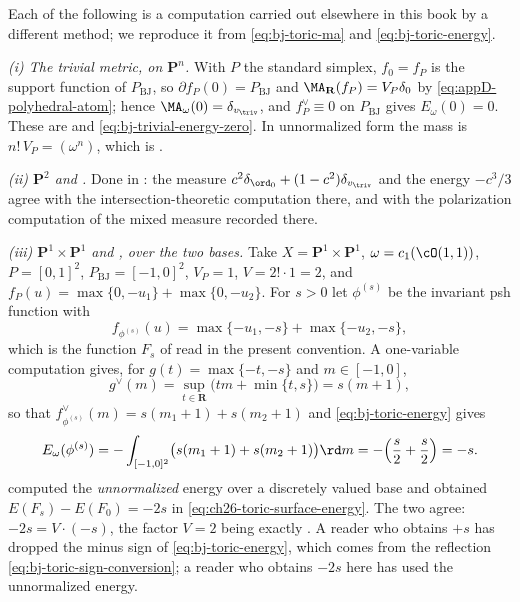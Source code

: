 \begin{example}
\label{ex:ch49-unit-tests}
Each of the following is a computation carried out elsewhere in this book
by a different method; we reproduce it from
\eqref{eq:bj-toric-ma} and \eqref{eq:bj-toric-energy}.

\emph{(i) The trivial metric, on $\mathbf P^n$.}  With $P$ the
standard simplex, $f_0=f_P$ is the support function of
$P_{\mathrm{BJ}}$, so $\partial f_P(0)=P_{\mathrm{BJ}}$ and
$\MA_{\mathbf R}(f_P)=V_P\delta_0$ by
\eqref{eq:appD-polyhedral-atom}; hence
$\MA_\omega(0)=\delta_{v_{\triv}}$, and
$f^\vee_P\equiv0$ on $P_{\mathrm{BJ}}$ gives $E_\omega(0)=0$.  These
are  and
\eqref{eq:bj-trivial-energy-zero}.  In unnormalized form the mass is
$n!\,V_P=(\omega^n)$, which is .

\emph{(ii) $\mathbf P^2$ and .}  Done in
: the measure
$c^2\delta_{\ord_0}+(1-c^2)\delta_{v_{\triv}}$ and the energy
$-c^3/3$ agree with the intersection-theoretic computation there, and
with the polarization computation of the mixed measure recorded there.

\emph{(iii) $\mathbf P^1\times\mathbf P^1$ and
, over the two bases.}  Take
$X=\mathbf P^1\times\mathbf P^1$, $\omega=c_1(\cO(1,1))$,
$P=[0,1]^2$, $P_{\mathrm{BJ}}=[-1,0]^2$, $V_P=1$,
$V=2!\cdot1=2$, and
$f_P(u)=\max\{0,-u_1\}+\max\{0,-u_2\}$.  For $s>0$ let
$\phi^{(s)}$ be the invariant psh function with
\[
 f_{\phi^{(s)}}(u)=\max\{-u_1,-s\}+\max\{-u_2,-s\},
\]
which is the function $F_s$ of  read in the
present convention.  A one-variable computation gives, for
$g(t)=\max\{-t,-s\}$ and $m\in[-1,0]$,
\[
 g^\vee(m)=\sup_{t\in\mathbf R}\bigl(tm+\min\{t,s\}\bigr)=s(m+1),
\]
so that $f^\vee_{\phi^{(s)}}(m)=s(m_1+1)+s(m_2+1)$ and
\eqref{eq:bj-toric-energy} gives
\[
 E_\omega(\phi^{(s)})
 =-\int_{[-1,0]^2}\bigl(s(m_1+1)+s(m_2+1)\bigr)\rd m
 =-\Bigl(\frac s2+\frac s2\Bigr)=-s .
\]
 computed the \emph{unnormalized} energy over a
discretely valued base and obtained
$E(F_s)-E(F_0)=-2s$ in \eqref{eq:ch26-toric-surface-energy}.  The two
agree: $-2s=V\cdot(-s)$, the factor $V=2$ being exactly
.  A reader who obtains $+s$ has dropped
the minus sign of \eqref{eq:bj-toric-energy}, which comes from the
reflection \eqref{eq:bj-toric-sign-conversion}; a reader who obtains
$-2s$ here has used the unnormalized energy.


\end{example}

